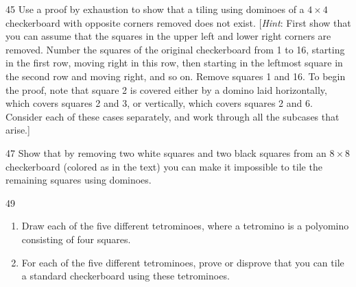 \documentclass[11pt]{article}
\begin{document}
\begin{exercise}{45}
    Use a proof by exhaustion to show that a tiling using dominoes of a
    $4 \times 4$ checkerboard with opposite corners removed does not
    exist.
    [\emph{Hint}: First show that you can assume that the squares in
    the upper left and lower right corners are removed. Number the
    squares of the original checkerboard from 1 to 16, starting in the
    first row, moving right in this row, then starting in the leftmost
    square in the second row and moving right, and so on. Remove
    squares 1 and 16. To begin the proof, note that square 2 is
    covered either by a domino laid horizontally, which covers squares
    2 and 3, or vertically, which covers squares 2 and 6. Consider
    each of these cases separately, and work through all the subcases
    that arise.]
\end{exercise}

\begin{exercise}{47}
    Show that by removing two white squares and two black squares from
    an $8 \times 8$ checkerboard (colored as in the text) you can make
    it impossible to tile the remaining squares using dominoes.
\end{exercise}

\begin{exercise}{49}
    \begin{enumerate}[label=(\alph*)]
        \item Draw each of the five different tetrominoes, where a
        tetromino is a polyomino consisting of four squares.
        \item For each of the five different tetrominoes, prove or
        disprove that you can tile a standard checkerboard using these
        tetrominoes.
    \end{enumerate}
\end{exercise}
\end{document}
